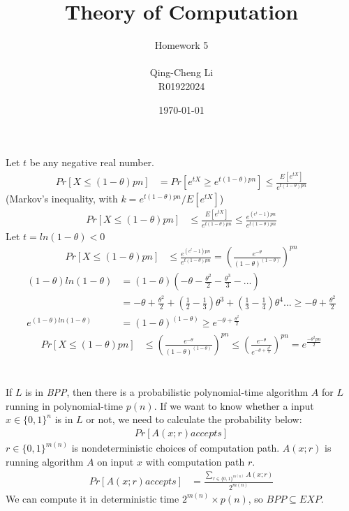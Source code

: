 \documentclass[11pt]{article}
\title{\textbf{Theory of Computation}}
\author{Homework 5\\
					\\
		Qing-Cheng Li\\
		R01922024}
\date{\today}
\begin{document}
\maketitle
\section{}
Let $t$ be any negative real number.
\begin{align*}
Pr[X \leq (1-\theta)pn] &= Pr[e^{tX} \geq e^{t(1-\theta)pn}] \leq \frac{E[e^{tX}]}{e^{t(1-\theta)pn}}
\end{align*}
(Markov's inequality, with $k = e^{t(1-\theta)pn}/E[e^{tX}]$)
\begin{align*}
Pr[X \leq (1-\theta)pn] & \leq \frac{E[e^{tX}]}{e^{t(1-\theta)pn}} \leq \frac{e^{(e^t-1)pn}}{e^{t(1-\theta)pn}}
\end{align*}
Let $t = ln(1-\theta) < 0$
\begin{align*}
Pr[X \leq (1-\theta)pn] & \leq \frac{e^{(e^t-1)pn}}{e^{t(1-\theta)pn}} = (\frac{e^{-\theta}}{(1-\theta)^{(1-\theta)}})^{pn}
\end{align*}
\begin{align*}
(1-\theta)ln(1-\theta) &= (1-\theta)(-\theta-\frac{\theta^2}{2}-\frac{\theta^3}{3}-...)\\
&= -\theta+\frac{\theta^2}{2}+(\frac{1}{2}-\frac{1}{3})\theta^3+(\frac{1}{3}-\frac{1}{4})\theta^4... \geq -\theta+\frac{\theta^2}{2}\\
e^{(1-\theta)ln(1-\theta)} &= (1-\theta)^{(1-\theta)} \geq e^{-\theta+\frac{\theta^2}{2}}
\end{align*}
\begin{align*}
Pr[X \leq (1-\theta)pn] & \leq (\frac{e^{-\theta}}{(1-\theta)^{(1-\theta)}})^{pn} \leq (\frac{e^{-\theta}}{e^{-\theta+\frac{\theta^2}{2}}})^{pn} = e^{\frac{-\theta^2pn}{2}}
\end{align*}

\section{}
If $L$ is in \emph{BPP}, then there is a probabilistic polynomial-time algorithm $A$ for $L$ running in polynomial-time $p(n)$. If we want to know whether a input $x \in \{0,1\}^n$ is in $L$ or not, we need to calculate the probability below:  
\begin{align*}
Pr[A(x;r) accepts]
\end{align*}
$r \in \{0,1\}^{m(n)}$ is nondeterministic choices of computation path. $A(x;r)$ is running algorithm $A$ on input $x$ with computation path $r$. 
\begin{align*}
Pr[A(x;r) accepts] &= \frac{\sum_{r \in \{0,1\}^{m(n)}}A(x;r)}{2^{m(n)}}
\end{align*}
We can compute it in deterministic time $2^{m(n)} \times p(n)$, so $BPP \subseteq EXP $.
\end{document}
